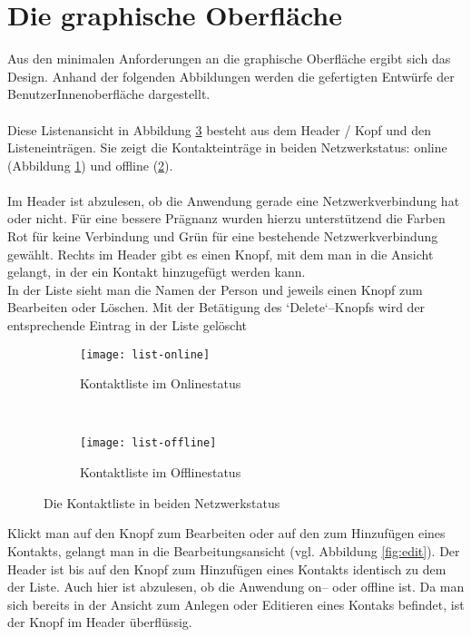 \section{Die graphische Oberfläche}
Aus den minimalen Anforderungen an die graphische Oberfläche ergibt sich das Design.
Anhand der folgenden Abbildungen werden die gefertigten Entwürfe der BenutzerInnenoberfläche dargestellt.\\\\
Diese Listenansicht in Abbildung \ref{fig:list} besteht aus dem Header / Kopf und den Listeneinträgen.
Sie zeigt die Kontakteinträge in beiden Netzwerkstatus: online (Abbildung \ref{fig:list-online}) und offline (\ref{fig:list-offline}).\\\\
%
%
Im Header ist abzulesen, ob die Anwendung gerade eine Netzwerkverbindung hat oder nicht.
Für eine bessere Prägnanz wurden hierzu unterstützend die Farben Rot für keine Verbindung und Grün für eine bestehende Netzwerkverbindung gewählt.
Rechts im Header gibt es einen Knopf, mit dem man in die Ansicht gelangt, in der ein Kontakt hinzugefügt werden kann.\\
%
In der Liste sieht man die Namen der Person und jeweils einen Knopf zum Bearbeiten oder Löschen.
Mit der Betätigung des `Delete`--Knopfs wird der entsprechende Eintrag in der Liste gelöscht
\begin{figure}[H]
  \centering
  \begin{subfigure}[t]{0.49\textwidth}
          \texttt{[image: list-online]}
          \caption{Kontaktliste im Onlinestatus}
          \label{fig:list-online}
  \end{subfigure}
  ~ 
  \begin{subfigure}[t]{0.49\textwidth}
          \texttt{[image: list-offline]}
          \caption{Kontaktliste im Offlinestatus}
          \label{fig:list-offline}
  \end{subfigure}
  \grayRule
  \caption{Die Kontaktliste in beiden Netzwerkstatus}
  \label{fig:list}
\end{figure}
Klickt man auf den Knopf zum Bearbeiten oder auf den zum Hinzufügen eines Kontakts, gelangt man in die Bearbeitungsansicht (vgl. Abbildung \ref{fig:edit}). Der Header ist bis auf den Knopf zum Hinzufügen eines Kontakts identisch zu dem der Liste. Auch hier ist abzulesen, ob die Anwendung on-- oder offline ist. Da man sich bereits in der Ansicht zum Anlegen oder Editieren eines Kontaks befindet, ist der Knopf im Header überflüssig.\\
